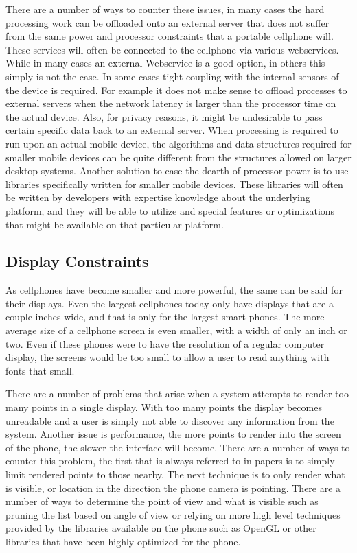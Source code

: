 \documentclass{acm_proc_article-sp}
\begin{document}
There are a number of ways to counter these issues, in many cases the hard processing work can be offloaded onto an external server that does not suffer from the same power and processor constraints that a portable cellphone will. These services will often be connected to the cellphone via various webservices. While in many cases an external Webservice is a good option, in others this simply is not the case. In some cases tight coupling with the internal sensors of the device is required.  For example it does not make sense to offload processes to external servers when the network latency is larger than the processor time on the actual device.  Also, for privacy reasons, it might be undesirable to pass certain specific data back to an external server. When processing is required to run upon an actual mobile device, the algorithms and data structures required for smaller mobile devices can be quite different from the structures allowed on larger desktop systems.  \cite{wagner2009making} Another solution to ease the dearth of processor power is to use libraries specifically written for smaller mobile devices.  These libraries will often be written by developers with expertise knowledge about the underlying platform, and they will be able to utilize and special features or optimizations that might be available on that particular platform.  

\subsection{Display Constraints}
As cellphones have become smaller and more powerful, the same can be said for their displays.  Even the largest cellphones today only have displays that are a couple inches wide, and that is only for the largest smart phones.  The more average size of a cellphone screen is even smaller, with a width of only an inch or two.  Even if these phones were to have the resolution of a regular computer display, the screens would be too small to allow a user to read anything with fonts that small.

There are a number of problems that arise when a system attempts to render too many points in a single display.  With too many points the display becomes unreadable and a user is simply not able to discover any information from the system.  Another issue is performance, the more points to render into the screen of the phone, the slower the interface will become.  There are a number of ways to counter this problem, the first that is always referred to in papers is to simply limit rendered points to those nearby.  \cite{pombinholocation} \cite{FIMEMORE} The next technique is to only render what is visible, or location in the direction the phone camera is pointing.  There are a number of ways to determine the point of view and what is visible such as pruning the list based on angle of view or relying on more high level techniques provided by the libraries available on the phone such as OpenGL or other libraries that have been highly optimized for the phone.  
\end{document}
